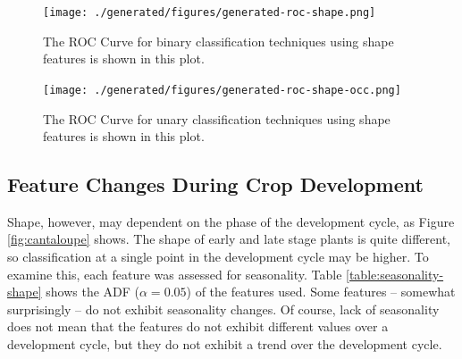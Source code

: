 \documentclass[letterpaper, notitlepage]{report}
\begin{document}
{
\renewcommand{\arraystretch}{0.9}

}

\begin{figure}[!htbp]
	\centering
	\texttt{[image: ./generated/figures/generated-roc-shape.png]}
	\caption[ROC Curve for binary classification using shape features]{The ROC Curve for binary classification techniques using shape features is shown in this plot.}
	\label{fig:roc-shape}
\end{figure}

\begin{figure}[!htbp]
	\centering
	\texttt{[image: ./generated/figures/generated-roc-shape-occ.png]}
	\caption[ROC Curve for unary classification using shape features]{The ROC Curve for unary classification techniques using shape features is shown in this plot.}
	\label{fig:roc-shape-occ}
\end{figure}

\subsection{Feature Changes During Crop Development}
Shape, however, may dependent on the phase of the development cycle, as Figure \ref{fig:cantaloupe} shows. The shape of early and late stage plants is quite different, so classification at a single point in the development cycle may be higher.  To examine this, each feature was assessed for seasonality. Table \ref{table:seasonality-shape} shows the ADF ($\alpha = 0.05$) of the features used.  Some features -- somewhat surprisingly -- do not exhibit seasonality changes. Of course, lack of seasonality does not mean that the features do not exhibit different values over a development cycle, but they do not exhibit a trend over the development cycle.

{
\renewcommand{\arraystretch}{0.9}

}
\end{document}
